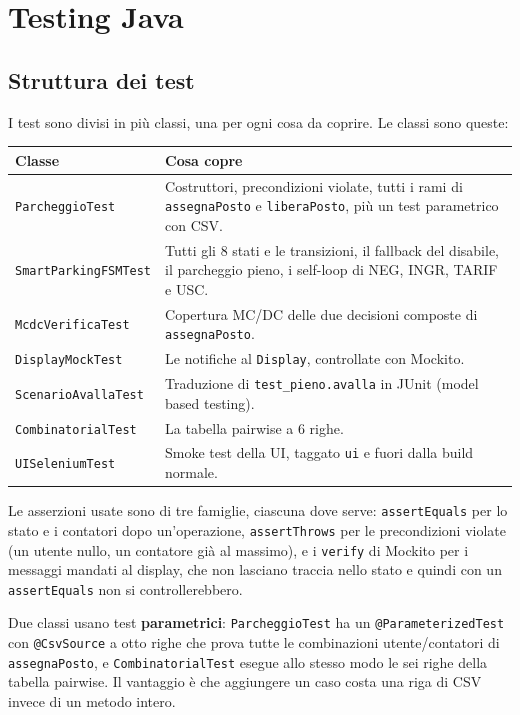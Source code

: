 \section{Testing Java}
\label{sec:testing}

\subsection{Struttura dei test}

I test sono divisi in più classi, una per ogni cosa da coprire.
Le classi sono queste:

\begin{longtable}{@{}p{4.3cm}p{8.7cm}@{}}
\toprule
\textbf{Classe} & \textbf{Cosa copre} \\
\midrule
\endhead
\texttt{ParcheggioTest} & Costruttori, precondizioni violate, tutti i rami di \texttt{assegnaPosto} e \texttt{liberaPosto}, più un test parametrico con CSV. \\
\texttt{SmartParkingFSMTest} & Tutti gli 8 stati e le transizioni, il fallback del disabile, il parcheggio pieno, i self-loop di NEG, INGR, TARIF e USC. \\
\texttt{McdcVerificaTest} & Copertura MC/DC delle due decisioni composte di \texttt{assegnaPosto}. \\
\texttt{DisplayMockTest} & Le notifiche al \texttt{Display}, controllate con Mockito. \\
\texttt{ScenarioAvallaTest} & Traduzione di \texttt{test\_pieno.avalla} in JUnit (model based testing). \\
\texttt{CombinatorialTest} & La tabella pairwise a 6 righe. \\
\texttt{UISeleniumTest} & Smoke test della UI, taggato \texttt{ui} e fuori dalla build normale. \\
\bottomrule
\end{longtable}

Le asserzioni usate sono di tre famiglie, ciascuna dove serve: \texttt{assertEquals} per
lo stato e i contatori dopo un'operazione, \texttt{assertThrows} per le precondizioni
violate (un utente nullo, un contatore già al massimo), e i \texttt{verify} di Mockito per
i messaggi mandati al display, che non lasciano traccia nello stato e quindi con un
\texttt{assertEquals} non si controllerebbero.

Due classi usano test \textbf{parametrici}: \texttt{ParcheggioTest} ha un
\texttt{@ParameterizedTest} con \texttt{@CsvSource} a otto righe che prova tutte le
combinazioni utente/contatori di \texttt{assegnaPosto}, e \texttt{CombinatorialTest}
esegue allo stesso modo le sei righe della tabella pairwise. Il vantaggio è che aggiungere
un caso costa una riga di CSV invece di un metodo intero.


